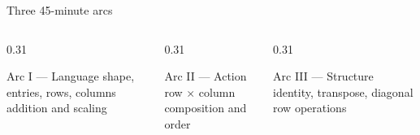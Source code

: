 \begin{frame}{Three 45-minute arcs}
  \begin{columns}[T,onlytextwidth]
    \begin{column}{0.31\textwidth}
      \begin{block}{Arc I — Language}
        \centering
        shape, entries, rows, columns\\[0.3cm]
        addition and scaling
      \end{block}
    \end{column}
    \begin{column}{0.31\textwidth}
      \begin{exampleblock}{Arc II — Action}
        \centering
        row $\times$ column\\[0.3cm]
        composition and order
      \end{exampleblock}
    \end{column}
    \begin{column}{0.31\textwidth}
      \begin{alertblock}{Arc III — Structure}
        \centering
        identity, transpose, diagonal\\[0.3cm]
        row operations
      \end{alertblock}
    \end{column}
  \end{columns}
\end{frame}
